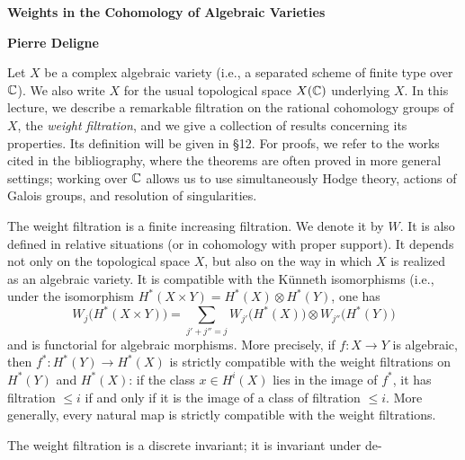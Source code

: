 \documentclass[8pt]{extarticle}
\begin{document}
\ReaderFont


\vspace*{15mm}
\begin{center}
{\sffamily\bfseries\fontsize{15}{17}\selectfont Weights in the Cohomology of Algebraic Varieties\par}
\vspace{5mm}
{\sffamily\bfseries\fontsize{10}{11}\selectfont Pierre Deligne\par}
\end{center}
\vspace{5mm}

 Let \(X\) be a complex algebraic variety (i.e., a separated scheme of finite type over \(\mathbb{C}\)). We also write \(X\) for the usual topological space \(X(\mathbb{C})\) underlying \(X\). In this lecture, we describe a remarkable filtration on the rational cohomology groups of \(X\), the \emph{weight filtration}, and we give a collection of results concerning its properties. Its definition will be given in §12. For proofs, we refer to the works cited in the bibliography, where the theorems are often proved in more general settings; working over \(\mathbb{C}\) allows us to use simultaneously Hodge theory, actions of Galois groups, and resolution of singularities.

The weight filtration is a finite increasing filtration. We denote it by \(W\). It is also defined in relative situations (or in cohomology with proper support). It depends not only on the topological space \(X\), but also on the way in which \(X\) is realized as an algebraic variety. It is compatible with the Künneth isomorphisms (i.e., under the isomorphism \(H^*(X\times Y)=H^*(X)\otimes H^*(Y)\), one has
\[
W_j\bigl(H^*(X\times Y)\bigr)=\sum_{j'+j''=j}W_{j'}\bigl(H^*(X)\bigr)\otimes W_{j''}\bigl(H^*(Y)\bigr)
\]
and is functorial for algebraic morphisms. More precisely, if \(f:X\to Y\) is algebraic, then \(f^*:H^*(Y)\to H^*(X)\) is strictly compatible with the weight filtrations on \(H^*(Y)\) and \(H^*(X)\): if the class \(x\in H^i(X)\) lies in the image of \(f^*\), it has filtration \(\le i\) if and only if it is the image of a class of filtration \(\le i\). More generally, every natural map is strictly compatible with the weight filtrations.

The weight filtration is a discrete invariant; it is invariant under de-
\end{document}
